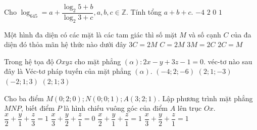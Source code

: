 \begin{ex}%
	Cho $ \log_645=a+\dfrac{\log_2 5+b}{\log_2 3+c},a,b,c\in\mathbb{Z} $. Tính tổng $ a+b+c. $
	\choice
	{$ -4 $}
	{$ 2 $}
	{$ 0 $}
	{\True $ 1 $}
\end{ex}
\begin{ex}%
	Một hình đa diện có các mặt là các tam giác thì số mặt $ M $ và số cạnh $ C $ của đa diện đó thỏa mãn hệ thức nào dưới đây
	\choice
	{$ 3C=2M $}
	{$ C=2M $}
	{\True $ 3M=2C $}
	{ $ 2C=M $}	
\end{ex}
\begin{ex}%
	Trong hệ tọa độ $ Oxyz $ cho mặt phẳng $ (\alpha) \colon 2x-y+3z-1=0. $ véc-tơ nào sau đây là Véc-tơ pháp tuyến của mặt phẳng $ (\alpha) $.
	\choice
	{\True $ (-4;2;-6)$}
	{$ (2;1;-3) $}
	{$ (-2;1;3) $}
	{$ (2;1;3) $}
\end{ex}
\begin{ex}%
	Cho ba điểm $ M(0;2;0);N(0;0;1);A(3;2;1). $ Lập phương trình mặt phẳng $ MNP $, biết điểm $ P $ là hình chiếu vuông góc của điểm $ A $ lên trục $ Ox. $
	\choice
	{ $ \dfrac{x}{2}+\dfrac{y}{1}+\dfrac{z}{3}=1$}
	{$ \dfrac{x}{3}+\dfrac{y}{2}+\dfrac{z}{1}=0 $}
	{$ \dfrac{x}{2}+\dfrac{y}{1}+\dfrac{z}{1}=1 $}
	{\True $ \dfrac{x}{3}+\dfrac{y}{2}+\dfrac{z}{1}=1 $}
\end{ex}
